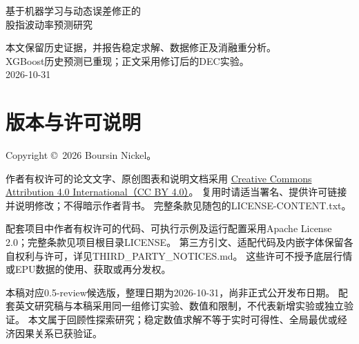 \documentclass[UTF8,fontset=fandol,11pt,a4paper]{ctexart}
\begin{document}
\begin{titlepage}\centering\vspace*{3cm}
{\LARGE 基于机器学习与动态误差修正的\\[0.6em]股指波动率预测研究\par}
\vspace{2cm}{\Large Boursin Nickel\par}\vspace{1cm}{\large 公开研究修订版\par}
\vfill
本文保留历史证据，并报告稳定求解、数据修正及消融重分析。\\
XGBoost历史预测已重现；正文采用修订后的DEC实验。\\[1em]
2026-10-31
\end{titlepage}
\section*{版本与许可说明}
\thispagestyle{plain}
Copyright \copyright\ 2026 Boursin Nickel。

作者有权许可的论文文字、原创图表和说明文档采用
\href{https://creativecommons.org/licenses/by/4.0/}{Creative Commons Attribution 4.0 International（CC BY 4.0）}。
复用时请适当署名、提供许可链接并说明修改；不得暗示作者背书。
完整条款见随包的LICENSE-CONTENT.txt。

配套项目中作者有权许可的代码、可执行示例及运行配置采用Apache License 2.0；完整条款见项目根目录LICENSE。
第三方引文、适配代码及内嵌字体保留各自权利与许可，详见THIRD\_PARTY\_NOTICES.md。
这些许可不授予底层行情或EPU数据的使用、获取或再分发权。

本稿对应0.5-review候选版，整理日期为2026-10-31，尚非正式公开发布日期。
配套英文研究稿与本稿采用同一组修订实验、数值和限制，不代表新增实验或独立验证。
本文属于回顾性探索研究；稳定数值求解不等于实时可得性、全局最优或经济因果关系已获验证。
\clearpage

\tableofcontents\clearpage
{}





\clearpage
\clearpage{}
\nocite{*}
\clearpage
\end{document}
